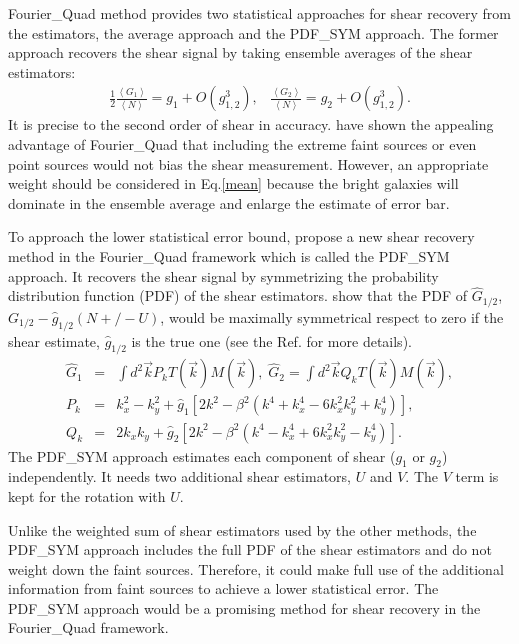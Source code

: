 \documentclass[twocolumn]{aastex62}
\begin{document}
Fourier\_Quad method provides two statistical approaches for shear recovery from the estimators, the average approach and the PDF\_SYM approach. The former approach recovers the shear signal by taking ensemble averages of the shear estimators:
\begin{eqnarray}
\label{mean}
\frac{1}{2}\frac{\left\langle  G_1\right\rangle }{\left\langle  N\right\rangle }=g_1+O(g_{1,2}^3),\;\;\;\frac{\left\langle  G_2\right\rangle }{\left\langle  N\right\rangle }=g_2+O(g_{1,2}^3).
\end{eqnarray}
It is precise to the second order of shear in accuracy\citep{Zhang2015}. \cite{Zhang2015} have shown the appealing advantage of Fourier\_Quad that including the extreme faint sources or even point sources would not bias the shear measurement. However, an appropriate weight should be considered in Eq.\ref{mean} because the bright galaxies will dominate in the ensemble average and enlarge the estimate of error bar.

To approach the lower statistical error bound, \cite{Zhang2017} propose a new shear recovery method in the Fourier\_Quad framework which is called the PDF\_SYM approach. It recovers the shear signal by symmetrizing the probability distribution function (PDF) of the shear estimators. \cite{Zhang2017} show that the PDF of $\hat{G}_{1/2}$, $G_{1/2} - \hat{g}_{1/2}(N +/- U)$, would be maximally symmetrical respect to zero if the shear estimate, $\hat{g}_{1/2}$ is the true one (see the Ref. for more details). 
\begin{eqnarray}
\hat{G}_{1}
&=& \int d^2\vec{k} P_k T(\vec{k})M(\vec{k}), 
\; \hat{G}_{2} = \int d^2\vec{k} Q_k T(\vec{k})M(\vec{k}),\\ \nonumber
P_k &=& k_x^2-k_y^2 + \hat{g}_1\left[2k^2-\beta^2\left(k^4+k_x^4-6k_x^2k_y^2+k_y^4\right)\right],\\ \nonumber
Q_k &=& 2k_xk_y+\hat{g}_2\left[2k^2-\beta^2\left(k^4-k_x^4+6k_x^2k_y^2-k_y^4\right)\right].
\end{eqnarray}
The PDF\_SYM approach estimates each component of shear ($g_1$ or $g_2$) independently. It needs two additional shear estimators, $U$ and $V$. The $V$ term is kept for the rotation with $U$. 

Unlike the weighted sum of shear estimators used by the other methods, the PDF\_SYM approach includes the full PDF of the shear estimators and do not weight down the faint sources. Therefore, it could make full use of the additional information from faint sources to achieve a lower statistical error. The PDF\_SYM approach would be a promising method for shear recovery in the Fourier\_Quad framework.
\end{document}
